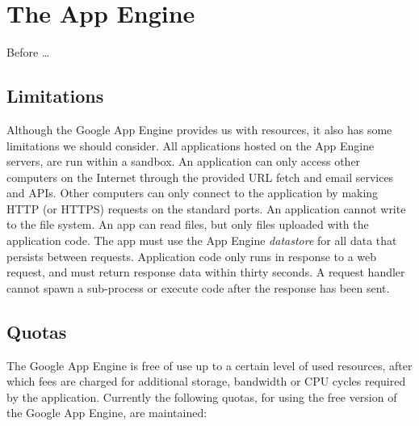\section{The App Engine}
Before \ldots

\subsection{Limitations}
Although the Google App Engine provides us with resources, it also has some
limitations we should consider. All applications hosted on the App Engine
servers, are run within a sandbox. An application can only access other computers
on the Internet through the provided URL fetch and email services and APIs. Other
computers can only connect to the application by making HTTP (or HTTPS) requests
on the standard ports. An application cannot write to the file system. An app can
read files, but only files uploaded with the application code. The app must use
the App Engine \emph{datastore} for all data that persists between requests.
Application code only runs in response to a web request, and must return response
data within thirty seconds. A request handler cannot spawn a sub-process or
execute code after the response has been sent.

\subsection{Quotas}
\label{appengine-quotas}
The Google App Engine is free of use up to a certain level of used resources,
after which fees are charged for additional storage, bandwidth or CPU cycles
required by the application. Currently the following quotas, for using the free
version of the Google App Engine, are maintained:

